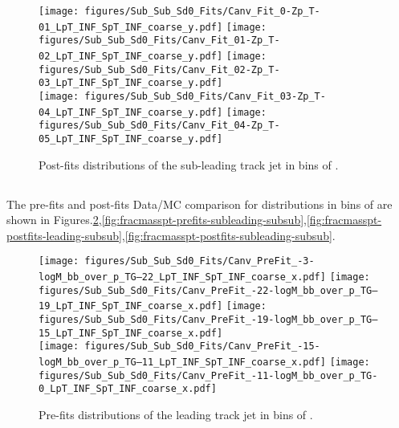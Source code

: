 \begin{figure}[htbp]
  \centering
 \texttt{[image: figures/Sub\_Sub\_Sd0\_Fits/Canv\_Fit\_0-Zp\_T-01\_LpT\_INF\_SpT\_INF\_coarse\_y.pdf]}
 \texttt{[image: figures/Sub\_Sub\_Sd0\_Fits/Canv\_Fit\_01-Zp\_T-02\_LpT\_INF\_SpT\_INF\_coarse\_y.pdf]}
 \texttt{[image: figures/Sub\_Sub\_Sd0\_Fits/Canv\_Fit\_02-Zp\_T-03\_LpT\_INF\_SpT\_INF\_coarse\_y.pdf]}\\
 \texttt{[image: figures/Sub\_Sub\_Sd0\_Fits/Canv\_Fit\_03-Zp\_T-04\_LpT\_INF\_SpT\_INF\_coarse\_y.pdf]}
 \texttt{[image: figures/Sub\_Sub\_Sd0\_Fits/Canv\_Fit\_04-Zp\_T-05\_LpT\_INF\_SpT\_INF\_coarse\_y.pdf]}

\caption{Post-fits \subsdzero distributions of the sub-leading track jet in bins of \zpt. }
  \label{fig:ZpT-postfits-subleading-subsub}
\end{figure}



\clearpage
\subsection{\mpt}

The pre-fits and post-fits Data/MC comparison for \subsubsdzero distributions in bins of \mpt are shown in Figures.\ref{fig:fracmasspt-prefits-leading-subsub},\ref{fig:fracmasspt-prefits-subleading-subsub},\ref{fig:fracmasspt-postfits-leading-subsub},\ref{fig:fracmasspt-postfits-subleading-subsub}.


\begin{figure}[htbp]
  \centering
 \texttt{[image: figures/Sub\_Sub\_Sd0\_Fits/Canv\_PreFit\_-3-logM\_bb\_over\_p\_TG--22\_LpT\_INF\_SpT\_INF\_coarse\_x.pdf]}
 \texttt{[image: figures/Sub\_Sub\_Sd0\_Fits/Canv\_PreFit\_-22-logM\_bb\_over\_p\_TG--19\_LpT\_INF\_SpT\_INF\_coarse\_x.pdf]}
 \texttt{[image: figures/Sub\_Sub\_Sd0\_Fits/Canv\_PreFit\_-19-logM\_bb\_over\_p\_TG--15\_LpT\_INF\_SpT\_INF\_coarse\_x.pdf]}\\
 \texttt{[image: figures/Sub\_Sub\_Sd0\_Fits/Canv\_PreFit\_-15-logM\_bb\_over\_p\_TG--11\_LpT\_INF\_SpT\_INF\_coarse\_x.pdf]}
 \texttt{[image: figures/Sub\_Sub\_Sd0\_Fits/Canv\_PreFit\_-11-logM\_bb\_over\_p\_TG-0\_LpT\_INF\_SpT\_INF\_coarse\_x.pdf]}

\caption{Pre-fits \subsdzero distributions of the leading track jet in bins of \mpt. }
  \label{fig:fracmasspt-prefits-leading-subsub}
\end{figure}


